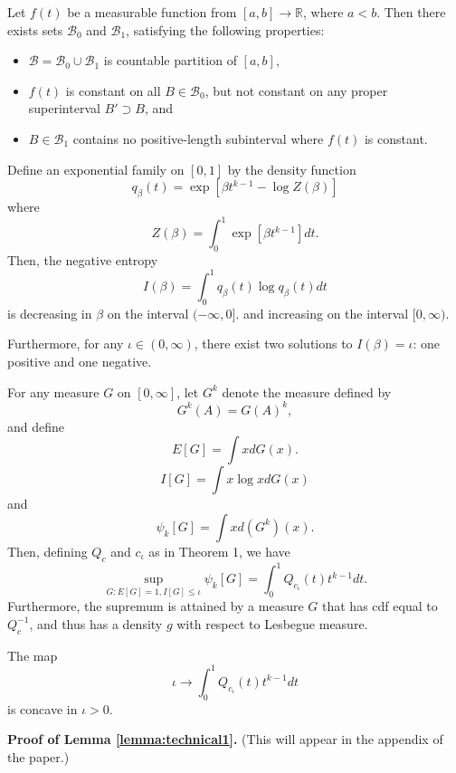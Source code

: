 \documentclass[12pt]{article}
\begin{document}
\begin{lemma}\label{lemma:technical2}
Let $f(t)$ be a measurable function from $[a,b] \to \mathbb{R}$, where $a < b.$
Then there exists sets $\mathcal{B}_0$ and $\mathcal{B}_1$, satisfying the following properties:
\begin{itemize}
\item  $\mathcal{B} = \mathcal{B}_0 \cup \mathcal{B}_1$ is countable partition of $[a,b]$,
\item  $f(t)$ is constant on all $B \in \mathcal{B}_0$, but not constant on any proper superinterval $B' \supset B$, and
\item $B \in \mathcal{B}_1$ contains no positive-length subinterval where $f(t)$ is constant.
\end{itemize}
\end{lemma}

\begin{lemma}\label{lemma:mono_entropy}
Define an exponential family on $[0,1]$ by the density function
\[
q_\beta(t) = \exp[\beta t^{k-1} - \log Z(\beta)]
\]
where
\[
Z(\beta) = \int_0^1 \exp[\beta t^{k-1}] dt.
\]
Then, the negative entropy
\[
I(\beta) = \int_0^1 q_\beta(t) \log q_\beta(t) dt
\]
is decreasing in $\beta$ on the interval $(-\infty, 0]$.
and increasing on the interval $[0, \infty)$.

Furthermore, for any $\iota \in (0,\infty)$, there exist two solutions
to $I(\beta) = \iota$: one positive and one negative.
\end{lemma}

\begin{lemma}\label{lemma:variational}
For any measure $G$ on $[0, \infty]$,
let $G^k$ denote the measure defined by
\[
G^k(A) = G(A)^k,
\]
and define
\[
E[G] = \int x dG(x).
\]
\[
I[G] = \int x \log x dG(x)
\]
and
\[
\psi_k[G] = \int x d(G^k)(x).
\]
Then, defining $Q_c$ and $c_\iota$ as in Theorem 1, we have
\[
\sup_{G: E[G] = 1, I[G] \leq \iota} \psi_k[G] = \int_0^1 Q_{c_\iota}(t) t^{k-1} dt.
\]
Furthermore, the supremum is attained by a measure $G$ that has cdf
equal to $Q_c^{-1}$, and thus has a density $g$ with respect to
Lesbegue measure.
\end{lemma}


\begin{lemma}\label{lemma:concave}
The map
\[
\iota \to \int_0^1 Q_{c_\iota}(t) t^{k-1} dt
\]
is concave in $\iota > 0$.
\end{lemma}

\textbf{Proof of Lemma \ref{lemma:technical1}.} (This will appear in the appendix of the paper.)
\end{document}
